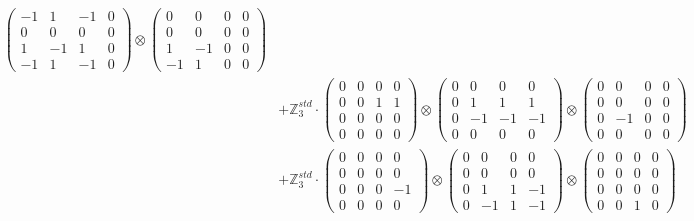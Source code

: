 \documentclass{article}
\begin{document}
{\begin{align}
            \begin{pmatrix} -1 & 1 & -1 & 0 \\ 0 & 0 & 0 & 0 \\ 1 & -1 & 1 & 0 \\ -1 & 1 & -1 & 0 \end{pmatrix} \otimes 
            \begin{pmatrix} 0 & 0 & 0 & 0 \\ 0 & 0 & 0 & 0 \\ 1 & -1 & 0 & 0 \\ -1 & 1 & 0 & 0 \end{pmatrix} \\ 
        &+ \label{Rs16-Rc11-Solution-26-c20} \mathbb{Z}_3^{std} \cdot 
            \begin{pmatrix} 0 & 0 & 0 & 0 \\ 0 & 0 & 1 & 1 \\ 0 & 0 & 0 & 0 \\ 0 & 0 & 0 & 0 \end{pmatrix} \otimes 
            \begin{pmatrix} 0 & 0 & 0 & 0 \\ 0 & 1 & 1 & 1 \\ 0 & -1 & -1 & -1 \\ 0 & 0 & 0 & 0 \end{pmatrix} \otimes 
            \begin{pmatrix} 0 & 0 & 0 & 0 \\ 0 & 0 & 0 & 0 \\ 0 & -1 & 0 & 0 \\ 0 & 0 & 0 & 0 \end{pmatrix} \\ 
        &+ \label{Rs16-Rc11-Solution-26-c21} \mathbb{Z}_3^{std} \cdot 
            \begin{pmatrix} 0 & 0 & 0 & 0 \\ 0 & 0 & 0 & 0 \\ 0 & 0 & 0 & -1 \\ 0 & 0 & 0 & 0 \end{pmatrix} \otimes 
            \begin{pmatrix} 0 & 0 & 0 & 0 \\ 0 & 0 & 0 & 0 \\ 0 & 1 & 1 & -1 \\ 0 & -1 & 1 & -1 \end{pmatrix} \otimes 
            \begin{pmatrix} 0 & 0 & 0 & 0 \\ 0 & 0 & 0 & 0 \\ 0 & 0 & 0 & 0 \\ 0 & 0 & 1 & 0 \end{pmatrix} \\ 

\end{align}}
\end{document}

